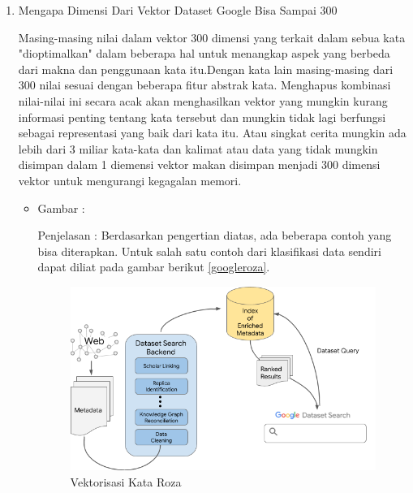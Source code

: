 \begin{enumerate}
\item Mengapa Dimensi Dari Vektor Dataset Google Bisa Sampai 300
\par Masing-masing nilai dalam vektor 300 dimensi yang terkait dalam sebua kata "dioptimalkan" dalam  beberapa hal untuk menangkap aspek yang  berbeda dari makna dan penggunaan kata itu.Dengan kata lain masing-masing dari 300 nilai sesuai dengan beberapa fitur abstrak kata. Menghapus kombinasi nilai-nilai ini secara acak akan menghasilkan vektor yang mungkin kurang informasi penting tentang kata tersebut dan mungkin tidak lagi berfungsi sebagai representasi yang baik dari kata itu. Atau singkat cerita mungkin ada lebih dari 3 miliar kata-kata dan kalimat atau data yang tidak mungkin disimpan dalam 1 diemensi vektor makan disimpan menjadi 300 dimensi vektor untuk mengurangi kegagalan memori.
\par
\begin{itemize}
\item Gambar :
\par Penjelasan : Berdasarkan pengertian diatas, ada beberapa contoh yang bisa diterapkan. Untuk salah satu contoh dari klasifikasi data sendiri dapat diliat pada gambar berikut \ref{googleroza}.
\begin{figure}[!hbtp]
\centering
\includegraphics[scale=0.4]{figures/googleroza.png}
\caption{Vektorisasi Kata Roza}
\label{text-fadila}
\end{figure}
\end{itemize}


\end{enumerate}
